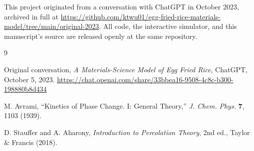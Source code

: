 \documentclass[11pt]{article}
\begin{document}
This project originated from a conversation with ChatGPT in October 2023, archived in full at \url{https://github.com/ktwu01/egg-fried-rice-materials-model/tree/main/original-2023}. All code, the interactive simulator, and this manuscript's source are released openly at the same repository.

\begin{thebibliography}{9}

Original conversation, \emph{A Materials-Science Model of Egg Fried Rice}, ChatGPT, October 5, 2023. \url{https://chat.openai.com/share/33bbea16-9508-4c8c-b300-198880b8d434}

M. Avrami, ``Kinetics of Phase Change. I: General Theory,'' \emph{J. Chem. Phys.} \textbf{7}, 1103 (1939).

D. Stauffer and A. Aharony, \emph{Introduction to Percolation Theory}, 2nd ed., Taylor \& Francis (2018).

\end{thebibliography}
\end{document}
